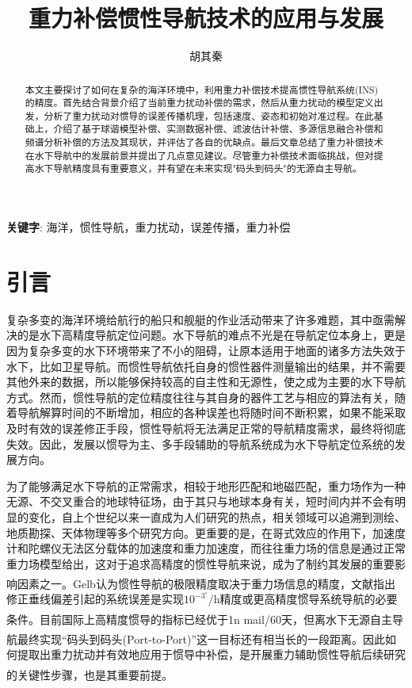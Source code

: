 \documentclass[12pt,a4,utf8]{article}
\title{重力补偿惯性导航技术的应用与发展}
\author{胡其秦}
\newcommand{\upcite}[1]{\textsuperscript{\textsuperscript{\cite{#1}}}} %
\newcommand\keywords[1]{\textbf{关键字}: #1} %
\begin{document}
\maketitle

\begin{abstract}
      本文主要探讨了如何在复杂的海洋环境中，利用重力补偿技术提高惯性导航系统(INS)的精度。首先结合背景介绍了当前重力扰动补偿的需求，然后从重力扰动的模型定义出发，分析了重力扰动对惯导的误差传播机理，包括速度、姿态和初始对准过程。在此基础上，介绍了基于球谐模型补偿、实测数据补偿、滤波估计补偿、多源信息融合补偿和频谱分析补偿的方法及其现状，并评估了各自的优缺点。最后文章总结了重力补偿技术在水下导航中的发展前景并提出了几点意见建议。尽管重力补偿技术面临挑战，但对提高水下导航精度具有重要意义，并有望在未来实现"码头到码头"的无源自主导航。
\end{abstract}


\keywords{海洋，惯性导航，重力扰动，误差传播，重力补偿}

\section{引言}

复杂多变的海洋环境给航行的船只和舰艇的作业活动带来了许多难题，其中亟需解决的是水下高精度导航定位问题。水下导航的难点不光是在导航定位本身上，更是因为复杂多变的水下环境带来了不小的阻碍，让原本适用于地面的诸多方法失效于水下，比如卫星导航。而惯性导航依托自身的惯性器件测量输出的结果，并不需要其他外来的数据，所以能够保持较高的自主性和无源性，使之成为主要的水下导航方式。然而，惯性导航的定位精度往往与其自身的器件工艺与相应的算法有关，随着导航解算时间的不断增加，相应的各种误差也将随时间不断积累，如果不能采取及时有效的误差修正手段，惯性导航将无法满足正常的导航精度需求，最终将彻底失效。因此，发展以惯导为主、多手段辅助的导航系统成为水下导航定位系统的发展方向。

为了能够满足水下导航的正常需求，相较于地形匹配和地磁匹配，重力场作为一种无源、不交叉重合的地球特征场，由于其只与地球本身有关，短时间内并不会有明显的变化，自上个世纪以来一直成为人们研究的热点，相关领域可以追溯到测绘、地质勘探、天体物理等多个研究方向。更重要的是，在哥式效应的作用下，加速度计和陀螺仪无法区分载体的加速度和重力加速度，而往往重力场的信息是通过正常重力场模型给出，这对于追求高精度的惯性导航来说，成为了制约其发展的重要影响因素之一。Gelb认为惯性导航的极限精度取决于重力场信息的精度\upcite{gelb1968geodetic}，文献\cite{peshekhonov2020problem}指出修正垂线偏差引起的系统误差是实现$10^{-3^{\circ} }$/h精度或更高精度惯导系统导航的必要条件。目前国际上高精度惯导的指标已经优于1n mail/60天\upcite{Zhaokun2022}，但离水下无源自主导航最终实现“码头到码头(Port-to-Port)”这一目标还有相当长的一段距离\upcite{moryl1997advanced}。因此如何提取出重力扰动并有效地应用于惯导中补偿，是开展重力辅助惯性导航后续研究的关键性步骤，也是其重要前提\upcite{WHCH20240724001}。
\end{document}
